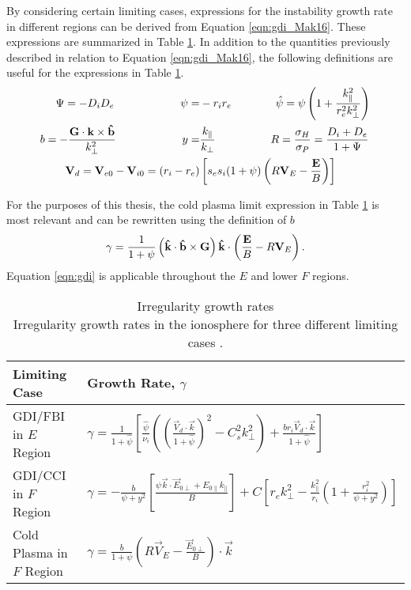 By considering certain limiting cases, expressions for the instability growth rate in different regions can be derived from Equation \ref{eqn:gdi_Mak16}.  These expressions are summarized in Table \ref{tab:gdi_exps}.  In addition to the quantities previously described in relation to Equation \ref{eqn:gdi_Mak16}, the following definitions are useful for the expressions in Table \ref{tab:gdi_exps}.
\begin{equation}
\begin{split}
	\Psi = -D_iD_e \quad\quad\quad\quad\quad\quad
	\psi =& -r_ir_e \quad\quad\quad\quad
	\hat{\psi} = \psi\left(1+\frac{k_\parallel^2}{r_e^2 k_\perp^2}\right) \\
	b = -\frac{\mathbf{G}\cdot\mathbf{k}\times\mathbf{\hat{b}}}{k_\perp^2} \quad\quad\quad\quad\quad\quad
	y =& \frac{k_\parallel}{k_\perp} \quad\quad\quad\quad\quad
	R = \frac{\sigma_H}{\sigma_P} = \frac{D_i+D_e}{1+\Psi} \\
	\mathbf{V}_d = \mathbf{V}_{e0}-\mathbf{V}_{i0} = (r_i-r_e)&\left[s_es_i(1+\psi)\left(R\mathbf{V}_E-\frac{\mathbf{E}}{B}\right)\right]
\end{split}
\end{equation}

For the purposes of this thesis, the cold plasma limit expression in Table \ref{tab:gdi_exps} is most relevant and can be rewritten using the definition of \(b\) \citep{Makarevich2014c,Makarevich2016a}
\begin{equation}
	\label{eqn:gdi}
	\gamma = \frac{1}{1+\psi}\left(\mathbf{\hat{k}}\cdot\mathbf{\hat{b}}\times\mathbf{G}\right)\mathbf{\hat{k}}\cdot\left(\frac{\mathbf{E}}{B}-R\mathbf{V}_E\right).
\end{equation}
Equation \ref{eqn:gdi} is applicable throughout the \(E\) and lower \(F\) regions.  

\begin{table}
	\centering
	\renewcommand{\arraystretch}{1.5}
	\setlength{\tabcolsep}{15pt}
	\begin{tabular}{l l}
	\textbf{Limiting Case} & \textbf{Growth Rate, \(\gamma\)} \\
	\hline
	GDI/FBI in \(E\) Region & \(\gamma = \frac{1}{1+\hat{\psi}}\left[\frac{\hat{\psi}}{\nu_i}\left(\left(\frac{\vec{V}_d\cdot \vec{k}}{1+\hat{\psi}}\right)^2-C_s^2 k_\perp^2\right)+\frac{br_i\vec{V}_d\cdot \vec{k}}{1+\hat{\psi}}\right]\) \\
	GDI/CCI in \(F\) Region & \(\gamma = -\frac{b}{\psi+y^2}\left[\frac{\psi\vec{k}\cdot\vec{E}_{0\perp}+E_{0\parallel}k_\parallel}{B}\right]+C\left[r_ek_\perp^2-\frac{k_\parallel^2}{r_i}\left(1+\frac{r_i^2}{\psi+y^2}\right)\right]\) \\
	Cold Plasma in \(F\) Region & \(\gamma = \frac{b}{1+\psi}\left(R\vec{V}_E-\frac{\vec{E}_{0\perp}}{B}\right)\cdot\vec{k}\) \\
	\end{tabular}
	\caption[Irregularity growth rates]{{\:}Irregularity growth rates\\ Irregularity growth rates in the ionosphere for three different limiting cases \citep{Makarevich2016a}.}
	\label{tab:gdi_exps}
\end{table}

